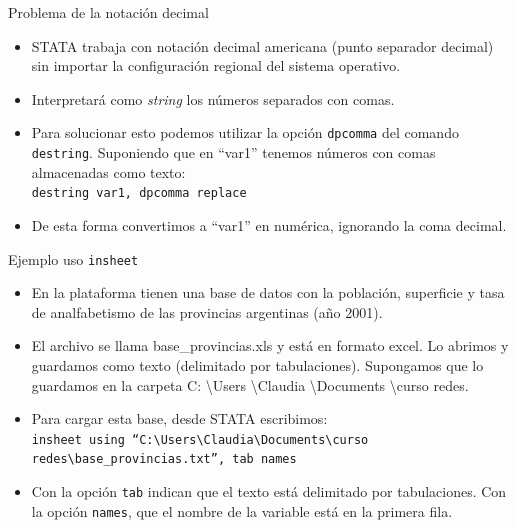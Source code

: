 \documentclass{beamer}
\begin{document}
\begin{frame}{Problema de la notación decimal}
\begin{itemize}
\item STATA trabaja con notación decimal americana (punto separador decimal) sin importar la configuración regional del sistema operativo.
\item Interpretará como \textit{string} los números separados con comas.
\item Para solucionar esto podemos utilizar la opción \texttt{dpcomma} del comando \texttt{destring}. Suponiendo que en ``var1'' tenemos números con comas almacenadas como texto:\\
\texttt{destring var1, dpcomma replace}\\
\item De esta forma convertimos a ``var1'' en numérica, ignorando la coma decimal.
\end{itemize}
\end{frame}

\begin{frame}{Ejemplo uso \texttt{insheet}}
\begin{itemize}
\item En la plataforma tienen una base de datos con la población, superficie y tasa de analfabetismo de las provincias argentinas (año 2001). 
\item El archivo se llama base\_provincias.xls y está en formato excel. Lo abrimos y guardamos como texto (delimitado por tabulaciones). Supongamos que lo guardamos en la carpeta C: \textbackslash Users \textbackslash Claudia \textbackslash Documents \textbackslash curso redes.
\item Para cargar esta base, desde STATA escribimos:\\
{\footnotesize \texttt{insheet using ``C:\textbackslash Users\textbackslash Claudia\textbackslash Documents\textbackslash curso redes\textbackslash base\_provincias.txt'', tab names}}
\item Con la opción \texttt{tab} indican que el texto está delimitado por tabulaciones. Con la opción \texttt{names}, que el nombre de la variable está en la primera fila.
\end{itemize}
\end{frame}
\end{document}
